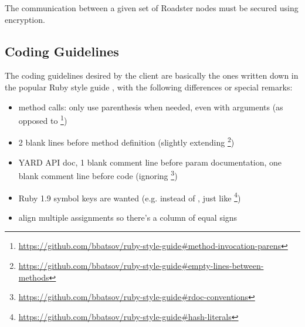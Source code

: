 The communication between a given set of Roadster nodes must be secured using
encryption.


\subsection{Coding Guidelines}
The coding guidelines desired by the client are basically the ones written down
in the popular Ruby style guide \cite{rb:style-guide}, with the following
differences or special remarks:

\begin{itemize}
	\item method calls: only use parenthesis when needed, even with arguments (as opposed to \footnote{\url{https://github.com/bbatsov/ruby-style-guide\#method-invocation-parens}})
	\item 2 blank lines before method definition (slightly extending \footnote{\url{https://github.com/bbatsov/ruby-style-guide\#empty-lines-between-methods}})
	\item YARD API doc, 1 blank comment line before param documentation, one blank comment line before code (ignoring \footnote{\url{https://github.com/bbatsov/ruby-style-guide\#rdoc-conventions}})
	\item Ruby 1.9 symbol keys are wanted (e.g.  instead of , just like \footnote{\url{https://github.com/bbatsov/ruby-style-guide\#hash-literals}})
	\item align multiple assignments so there's a column of equal signs
\end{itemize}
